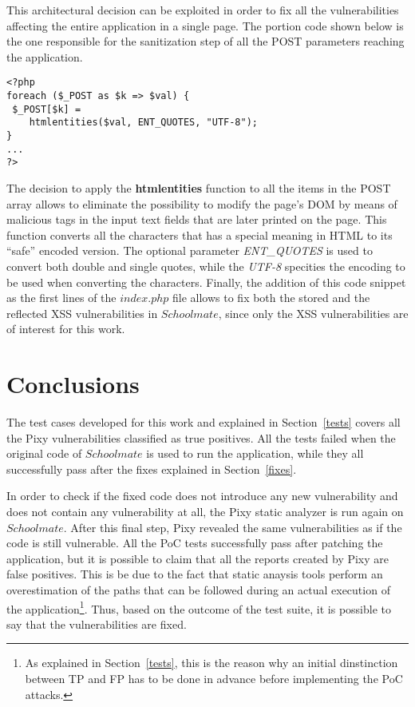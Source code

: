 \documentclass{sig-alternate-05-2015}
\begin{document}
This architectural decision can be exploited in order
to fix all the vulnerabilities affecting the entire application in a single page.
The portion code shown below is the one responsible for the sanitization step
of all the POST parameters reaching the application.

\begin{lstlisting}[frame=single, caption={Fixing all the vulnerabilities in index.php}]
<?php
foreach ($_POST as $k => $val) {
 $_POST[$k] =
    htmlentities($val, ENT_QUOTES, "UTF-8");
}
...
?>
\end{lstlisting}

The decision to apply the \textbf{htmlentities} function to all the items in the POST array allows
to eliminate the possibility to modify the page's DOM by means of malicious tags in the input
text fields that are later printed on the page. This function converts all the characters
that has a special meaning in HTML to its ``safe'' encoded version. The optional parameter
\emph{ENT\_QUOTES} is used to convert both double and single quotes, while the \emph{UTF-8}
specities the encoding to be used when converting the characters.
Finally, the addition of this code snippet as the first lines of the $index.php$ file allows to
fix both the stored and the reflected XSS vulnerabilities in $Schoolmate$, since only the XSS
vulnerabilities are of interest for this work.


\section{Conclusions}\label{outcomes}
The test cases developed for this work and explained in Section~\ref{tests} covers all the
Pixy vulnerabilities classified as true positives. All the tests failed when the original code
of $Schoolmate$ is used to run the application, while they all successfully pass after the
fixes explained in Section~\ref{fixes}.

In order to check if the fixed code does not introduce any new vulnerability and does not contain
any vulnerability at all, the Pixy static analyzer is run again on $Schoolmate$.
After this final step, Pixy revealed the same vulnerabilities as if the code is still vulnerable.
All the PoC tests successfully pass after patching the application, but it is possible to claim that
all the reports created by Pixy are false positives. This is be due to the fact that static anaysis
tools perform an overestimation of the paths that can be followed during an actual execution
of the application\footnote{As explained in Section~\ref{tests}, this is the reason why an initial
dinstinction between TP and FP has to be done in advance before implementing the PoC attacks.}.
Thus, based on the outcome of the test suite, it is possible to say that the vulnerabilities are
fixed.
\end{document}
